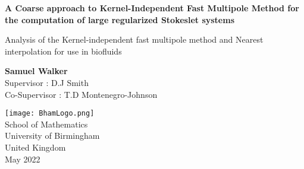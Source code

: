 \begin{titlepage}
    \begin{center}
        \vspace*{1cm}

        \LARGE
        \textbf{A Coarse approach to Kernel-Independent Fast Multipole Method for the computation of large regularized Stokeslet systems}

        \normalsize
        \vspace{0.5cm}
        Analysis of the Kernel-independent fast multipole method and Nearest interpolation for use in biofluids
        
        \vspace{1.5cm}
        
        \textbf{Samuel Walker}\\
        Supervisor : D.J Smith \\
        Co-Supervisor : T.D Montenegro-Johnson
        
        \vfill
        
        \vspace{0.8cm}
        
        \texttt{[image: BhamLogo.png]}\\
        
        \normalsize
        School of Mathematics\\
        University of Birmingham\\
        United Kingdom\\
        May 2022
            
    \end{center}
\end{titlepage}



